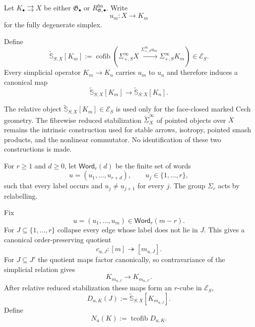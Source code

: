 Let $K_\bullet\rightrightarrows X$ be either $\mathfrak G_\bullet$ or
$R_{\mathfrak G,\bullet}^{\mathrm{fm}}$.  Write
\[
    u_m:X\longrightarrow K_m
\]
for the fully degenerate simplex.

\begin{definition}
\label{def:as-relative-reduced-stabilization}
Define
\[
\boxed{
    \widetilde{\mathbb S}_{S;X}[K_m]
    :=
    \operatorname{cofib}
    \left(
        \Sigma_{+,S}^{\infty}X
        \xrightarrow{\Sigma_{+,S}^{\infty}u_m}
        \Sigma_{+,S}^{\infty}K_m
    \right)
    \in\mathcal E_S.
}
\]
Every simplicial operator $K_m\to K_n$ carries $u_m$ to $u_n$ and therefore
induces a canonical map
\[
    \widetilde{\mathbb S}_{S;X}[K_m]
    \longrightarrow
    \widetilde{\mathbb S}_{S;X}[K_n].
\]
\end{definition}

\begin{remark}
The relative object
$\widetilde{\mathbb S}_{S;X}[K_m]\in\mathcal E_S$ is used only for the
face-closed marked Cech geometry.  The fibrewise reduced stabilization
$\widetilde\Sigma_X^\infty$ of pointed objects over $X$ remains the intrinsic
construction used for stable arrows, isotropy, pointed smash products, and the
nonlinear commutator.  No identification of these two constructions is made.
\end{remark}

\begin{definition}
\label{def:as-surjection-category}
For $r\geq1$ and $d\geq0$, let $\mathsf{Word}_r(d)$ be the finite set of words
\[
    u=(u_1,\ldots,u_{r+d}),
    \qquad
    u_j\in\{1,\ldots,r\},
\]
such that every label occurs and $u_j\neq u_{j+1}$ for every $j$.  The group
$\Sigma_r$ acts by relabelling.
\end{definition}

\begin{construction}
\label{con:as-marked-degeneracy-cube}
Fix
\[
    u=(u_1,\ldots,u_m)\in\mathsf{Word}_r(m-r).
\]
For $J\subseteq\{1,\ldots,r\}$ collapse every edge whose label does not lie in
$J$.  This gives a canonical order-preserving quotient
\[
    c_{u,J}:[m]\twoheadrightarrow[m_{u,J}].
\]
For $J\subseteq J'$ the quotient maps factor canonically, so contravariance of
the simplicial relation gives
\[
    K_{m_{u,J}}\longrightarrow K_{m_{u,J'}}.
\]
After relative reduced stabilization these maps form an $r$-cube in
$\mathcal E_S$,
\[
    D_{u,K}(J)
    :=
    \widetilde{\mathbb S}_{S;X}[K_{m_{u,J}}].
\]
Define
\[
\boxed{
    N_u(K):=\operatorname{tcofib}D_{u,K}.}
\]
\end{construction}

